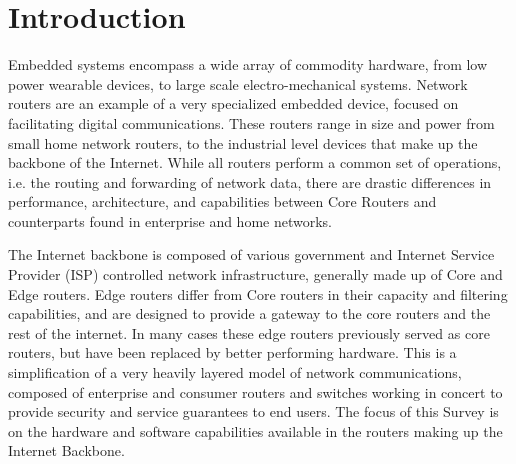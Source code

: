 \section{Introduction}
Embedded systems encompass a wide array of commodity hardware, from low power
wearable devices, to large scale electro-mechanical systems. Network routers
are an example of a very specialized embedded device, focused on facilitating
digital communications. These routers range in size and power from small home
network routers, to the industrial level devices that make up the backbone of
the Internet. While all routers perform a common set of operations, i.e. the
routing and forwarding of network data, there are drastic differences in
performance, architecture, and capabilities between Core Routers and
counterparts found in enterprise and home networks.

The Internet backbone is composed of various government and Internet Service
Provider (ISP) controlled network infrastructure, generally made up of Core and
Edge routers. Edge routers differ from Core routers in their capacity and
filtering capabilities, and are designed to provide a gateway to the core
routers and the rest of the internet. In many cases these edge routers
previously served as core routers, but have been replaced by better performing
hardware. This is a simplification of a very heavily layered model of network
communications, composed of enterprise and consumer routers and switches
working in concert to provide security and service guarantees to end users. The
focus of this Survey is on the hardware and software capabilities available in
the routers making up the Internet Backbone.





